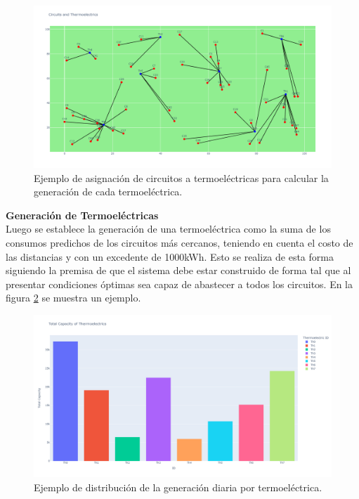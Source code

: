 \documentclass[twocolumn, fontsize=10pt]{article}
\begin{document}
  \begin{figure}[H]
    \centering
    \includegraphics[width=\columnwidth]{assets/newplot (2).png}
    \caption{Ejemplo de asignación de circuitos a termoeléctricas para calcular la generación de cada termoeléctrica.}
    \label{fig:circuitToTherm}
    \end{figure}

\textbf{Generación de Termoeléctricas}\\
 Luego se establece la generación de una termoeléctrica como la suma de los consumos 
  predichos de los circuitos más cercanos, teniendo en cuenta el costo de las distancias y con
  un excedente de 1000kWh. Esto se realiza de esta forma siguiendo la premisa de que el sistema debe
  estar construido de forma tal que al presentar condiciones óptimas sea capaz de abastecer a todos los circuitos. En la figura \ref{fig:generation} se 
  muestra un ejemplo.\\
  
  \begin{figure}[H]
    \centering
    \includegraphics[width=\columnwidth]{assets/total_capacities.png}
    \caption{Ejemplo de distribución de la generación diaria por termoeléctrica.}
    \label{fig:generation}
    \end{figure}
\end{document}
